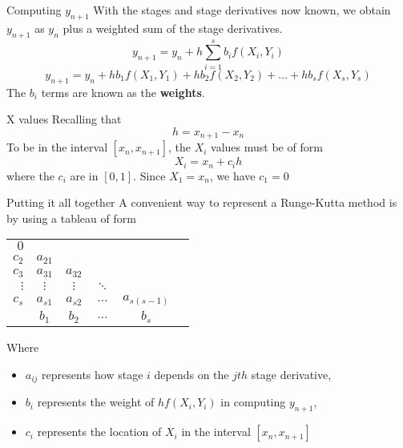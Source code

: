 \documentclass[12pt]{beamer}
\begin{document}
\begin{frame}{Computing $y_{n+1}$}
  With the stages and stage derivatives now known, we obtain $y_{n+1}$ as $y_n$ plus a 
   weighted sum of the stage derivatives.
  \pause
  $$y_{n+1} = y_n + h\sum_{i = 1}^s{b_if(X_i,Y_i)}$$  
  \pause
  $$y_{n+1} = y_n + hb_1f(X_1,Y_1) + hb_2f(X_2,Y_2) + \dots + hb_sf(X_s,Y_s)$$
  \newline
  \pause
  The $b_i$ terms are known as the \textbf{weights}.
\end{frame}

\begin{frame}{X values}
  Recalling that 
  $$h = x_{n+1} - x_n$$
  \pause
  To be in the interval $[x_n,x_{n+1}]$, the $X_i$ values must be of form
  $$X_i = x_n + c_ih$$ 
  where the $c_i$ are in $[0,1]$. \newline
  \newline
  \pause
  Since $X_1 = x_n$, we have $c_1 = 0$
\end{frame}

\begin{frame}{Putting it all together}
  A convenient way to represent a Runge-Kutta method is by using a tableau of form
  \begin{table}
  \centering
  \renewcommand{\arraystretch}{1.25}
     \begin{tabular}{r | c*{4}{c}}
                        $0$ \\
                    $c_2$ & $a_{21}$ \\
                    $c_3$ & $a_{31}$ & $a_{32}$ \\
                   $\vdots$ & $\vdots$      &  $\vdots$  & $\ddots$ \\
	        $c_s$ & $a_{s1}$  &  $a_{s2}$  & $\dots$ & $a_{s(s-1)}$\\
                     \hline
    \phantom{c4}     & $b_1$ & $b_2$ & $\dots$ & $b_s$ \\
    \end{tabular}
  \renewcommand{\arraystretch}{1.0}
  \end{table}
  \pause
  Where
  \begin{itemize}
    \item $a_{ij}$ represents how stage $i$ depends on the $jth$ stage derivative,
    \item $b_i$ represents the weight of $hf(X_i,Y_i)$ in computing $y_{n+1}$,
    \item $c_i$ represents the location of $X_i$ in the interval $[x_n,x_{n+1}]$
  \end{itemize}
\end{frame}
\end{document}
